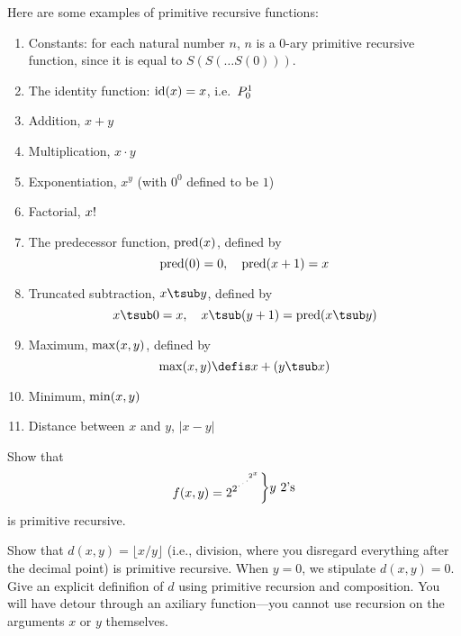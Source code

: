 \documentclass[../../include/open-logic-section]{subfiles}
\begin{document}


Here are some examples of primitive recursive functions:
\begin{enumerate}
\item Constants: for each natural number $n$, $n$ is a 0-ary primitive
  recursive function, since it is equal to $S(S(\dots S(0)))$.

\item The identity function: $\mathrm{id}(x) = x$, i.e.\ $P^{1}_{0}$

\item Addition, $x+y$

\item Multiplication, $x \cdot y$

\item Exponentiation, $x^y$ (with $0^0$ defined to be $1$)

\item Factorial, $x\text{!}$

\item The predecessor function, $\mathrm{pred}(x)$, defined by
\[
\mathrm{pred}(0) = 0, \quad \mathrm{pred}(x+1) = x
\]

\item Truncated subtraction, $x \tsub y$, defined by
\[
x \tsub 0 = x, \quad x \tsub (y+1) = \fn{pred}(x \tsub y)
\]

\item Maximum, $\mathrm{max}(x,y)$, defined by
\[
\fn{max}(x,y) \defis x + (y \tsub x)
\]

\item Minimum, $\mathrm{min}(x,y)$

\item Distance between $x$ and $y$, $\left|x-y\right|$
\end{enumerate}

\begin{prob}
Show that \[f(x, y) =
2^{2^{\iddots^{2^{x}}}}\raisebox{1ex}{\bigg\rbrace}
\raisebox{1ex}{\text {$y$ $2$'s}}\] is primitive recursive.
\end{prob}

\begin{prob}
Show that $d(x, y) = \lfloor x/y \rfloor$ (i.e., division, where you
disregard everything after the decimal point) is primitive
recursive. When $y = 0$, we stipulate $d(x, y) = 0$. Give an explicit
definifion of $d$ using primitive recursion and composition. You will
have detour through an axiliary function---you cannot use recursion on
the arguments $x$ or $y$ themselves.
\end{prob}
\end{document}
